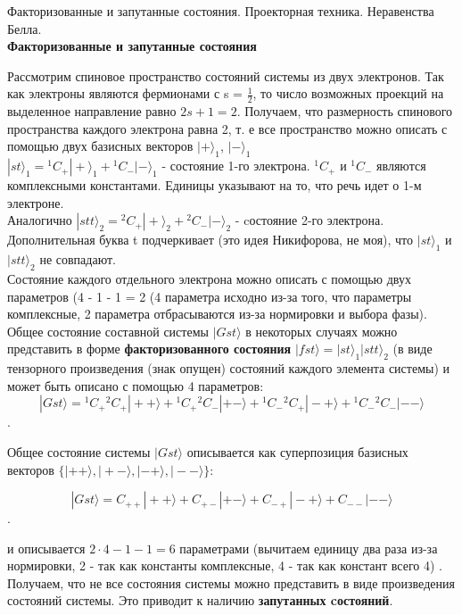 \documentclass[__main__.tex]{subfiles}
\begin{document}
Факторизованные и запутанные состояния. Проекторная техника. Неравенства Белла.\\ 

\textbf{Факторизованные и запутанные состояния}

Рассмотрим спиновое пространство состояний системы из двух электронов. Так как электроны являются фермионами с s = $\frac{1}{2}$, то число возможных проекций на выделенное направление равно $2s + 1 = 2$. Получаем, что размерность спинового пространства каждого электрона равна 2, т. е все пространство можно описать с помощью двух базисных векторов $|+\rangle_1$, $|-\rangle_1$\\

$|st\rangle_1 = {}^1 C_{+} |+\rangle_1 + {}^1 C_{-} |-\rangle_1$ - состояние 1-го электрона. ${}^1 C_{+}$ и ${}^1 C_{-}$ являются комплексными константами. Единицы указывают на то, что речь идет о 1-м электроне. \\

Аналогично $|stt\rangle_2 = {}^2 C_{+} |+\rangle_2 + {}^2 C_{-} |-\rangle_2$ - cостояние 2-го электрона. Дополнительная буква t подчеркивает (это идея Никифорова, не моя), что $|st\rangle_1$ и $|stt\rangle_2$ не совпадают.\\

Состояние каждого отдельного электрона можно описать с помощью двух параметров (4 - 1 - 1 = 2 (4 параметра исходно из-за того, что параметры комплексные, 2 параметра отбрасываются из-за нормировки и выбора фазы). \\

Общее состояние составной системы $|Gst\rangle$ в некоторых случаях можно представить в форме \textbf{факторизованного состояния} $|fst\rangle = |st\rangle_1 |stt\rangle_2$ (в виде тензорного произведения (знак опущен) состояний каждого элемента системы) и может быть описано с помощью 4 параметров:\\

$$|Gst\rangle = {}^1C_{+}{}^2C_{+}|++\rangle + {}^1C_{+}{}^2C_{-}|+-\rangle + {}^1C_{-}{}^2C_{+}|-+\rangle + {}^1C_{-}{}^2C_{-}|--\rangle$$.

Общее состояние системы $|Gst\rangle$ описывается как суперпозиция базисных векторов $\lbrace |++\rangle, |+-\rangle, |-+\rangle, |--\rangle \rbrace$:

$$|Gst\rangle = C_{++}|++\rangle + C_{+-}|+-\rangle + C_{-+}|-+\rangle + C_{--}|--\rangle$$.

и описывается $2 \cdot 4 - 1 - 1 = 6$ параметрами (вычитаем единицу два раза из-за нормировки, 2 - так как константы комплексные, 4 - так как констант всего 4) . Получаем, что не все состояния системы можно представить в виде произведения состояний системы. Это приводит к наличию \textbf{запутанных cостояний}.\\
\end{document}
